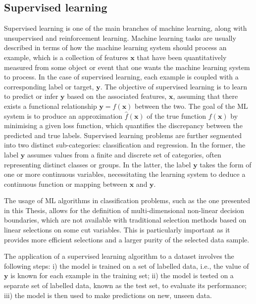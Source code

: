 \subsection{Supervised learning}
Supervised learning is one of the main branches of machine learning, along with unsupervised and reinforcement learning. Machine learning tasks are usually described in terms of how the machine learning system should process an example, which is a collection of features $\mathbf{x}$ that have been quantitatively measured from some object or event that one wants the machine learning system to process. In the case of supervised learning, each example is coupled with a corresponding label or target, $\mathbf{y}$. The objective of supervised learning is to learn to predict or infer $\mathbf{y}$ based on the associated features, $\mathbf{x}$, assuming that there exists a functional relationship $\mathbf{y} = f(\mathbf{x})$ between the two. The goal of the ML system is to produce an approximation $\widehat{f}(\mathbf{x})$ of the true function $f(\mathbf{x})$ by minimising a given loss function, which quantifies the discrepancy between the predicted and true labels. Supervised learning problems are further segmented into two distinct sub-categories: classification and regression. In the former, the label $\mathbf{y}$ assumes values from a finite and discrete set of categories, often representing distinct classes or groups. In the latter, the label $\mathbf{y}$ takes the form of one or more continuous variables, necessitating the learning system to deduce a continuous function or mapping between $\mathbf{x}$ and $\mathbf{y}$.

The usage of ML algorithms in classification problems, such as the one presented in this Thesis, allows for the definition of multi-dimensional non-linear decision boundaries, which are not available with traditional selection methods based on linear selections on some cut variables. This is particularly important as it provides more efficient selections and a larger purity of the selected data sample.

The application of a supervised learning algorithm to a dataset involves the following steps: i) the model is trained on a set of labelled data, i.e., the value of $\mathbf{y}$ is known for each example in the training set; ii) the model is tested on a separate set of labelled data, known as the test set, to evaluate its performance; iii) the model is then used to make predictions on new, unseen data.

